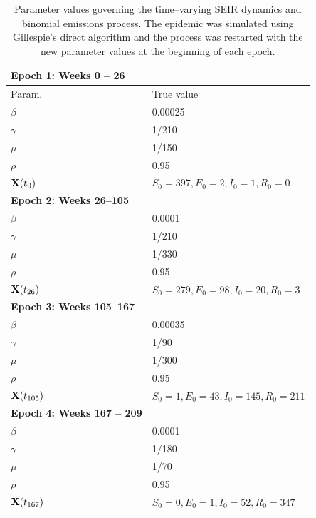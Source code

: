 \begin{small}
\begin{table}[htbp]
	\centering
	\begin{tabular}{ll}
		\textbf{Epoch 1: Weeks 0 -- 26} & \\
		\hline\hline
		Param. & True value \\ 
		\hline
		$ \beta $ &  0.00025 \\
		$ \gamma $ & 1/210\\
		$ \mu $ &  1/150 \\ 
		$ \rho $ &  0.95 \\
		$ \mathbf{X}(t_0) $ &  $ S_0 = 397, E_0 = 2, I_0 = 1, R_0 =0 $  \\ 
		\hline	
		\textbf{Epoch 2: Weeks 26--105} & \\
		\hline\hline
		$ \beta $ &  0.0001 \\
		$ \gamma $ & 1/210\\
		$ \mu $ &  1/330 \\ 
		$ \rho $ &  0.95 \\
		$ \mathbf{X}(t_{26}) $ &  $ S_0 = 279, E_0 = 98, I_0 = 20, R_0 =3 $  \\ 
		\hline
		\textbf{Epoch 3: Weeks 105--167} & \\
		\hline\hline
		$ \beta $ &  0.00035 \\
		$ \gamma $ & 1/90\\
		$ \mu $ &  1/300 \\ 
		$ \rho $ &  0.95 \\
		$ \mathbf{X}(t_{105}) $ &  $ S_0 = 1, E_0 = 43, I_0 = 145, R_0 =211 $  \\ 
		\hline
		\textbf{Epoch 4: Weeks 167 -- 209} & \\
		\hline\hline
		$ \beta $ &  0.0001 \\
		$ \gamma $ & 1/180\\
		$ \mu $ &  1/70 \\ 
		$ \rho $ &  0.95 \\
		$ \mathbf{X}(t_{167}) $ &  $ S_0 = 0, E_0 = 1, I_0 = 52, R_0 = 347 $\\
		\hline
	\end{tabular}
	\caption[Simulation 2 SEIR model parameters.]{Parameter values governing the time--varying SEIR dynamics and binomial emissions process. The epidemic was simulated using Gillespie's direct algorithm and the process was restarted with the new parameter values at the beginning of each epoch.}
	\label{tab:misspec_sim_params}
\end{table}
\end{small}

